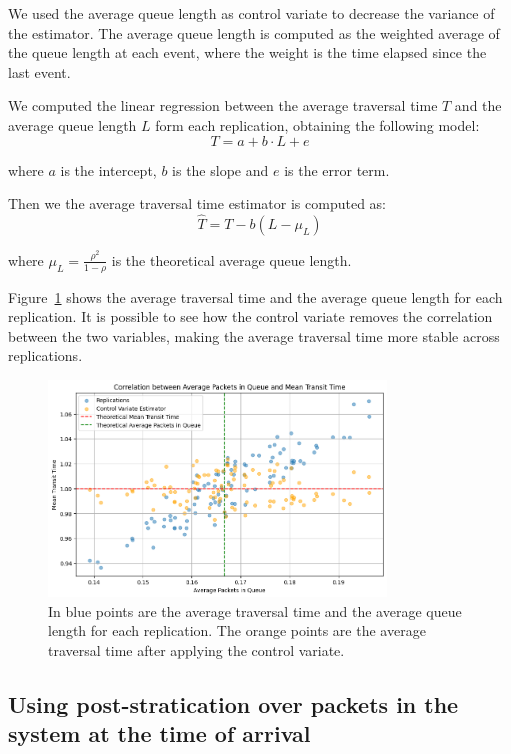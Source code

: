 \documentclass[a4paper]{article}
\begin{document}
We used the average queue length as control variate to decrease the variance of the estimator. The average queue length is computed as the weighted average of the queue length at each event, where the weight is the time elapsed since the last event.

We computed the linear regression between the average traversal time $T$ and the average queue length
$L$ form each replication, obtaining the following model:
\begin{equation}
  T = a + b \cdot L + e
\end{equation}

where $a$ is the intercept, $b$ is the slope and $e$ is the error term.

Then we the average traversal time estimator is computed as:
\begin{equation}
  \hat{T} = T - b (
    L - \mu_L
  )
\end{equation}

where $\mu_L = \frac{\rho^2}{1 - \rho}$ is the theoretical average queue length.

Figure~\ref{fig:e2p2-corr} shows the average traversal time and the average queue length for each replication. It is possible to see how the control variate removes the correlation between the two variables, making the average traversal time more stable across replications.

\begin{figure}[htbp]
  \centering
  \includegraphics[width=0.8\textwidth]{images/ex2_p2_corr.png}
  \caption{
    In blue points are the average traversal time and the average queue length for each replication.
    The orange points are the average traversal time after applying the control variate.
  }\label{fig:e2p2-corr}
\end{figure}

\subsection*{Using post-stratication over packets in the system at the time of arrival}
\end{document}
